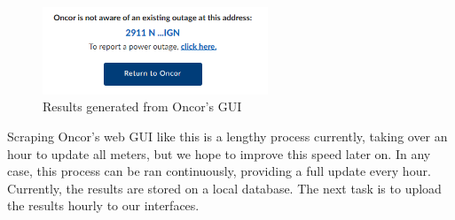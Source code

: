 \documentclass[]{article}
\begin{document}
\begin{figure}[h]
    \centering
    \includegraphics[width=0.6\textwidth]{oncor_status.PNG}
    \caption{Results generated from Oncor's GUI}
    \label{fig:oncor_out}    
\end{figure}
Scraping Oncor's web GUI like this is a lengthy process currently, taking over an hour to update all meters, but we hope to improve this speed later on. In any case, this process can be ran continuously, providing a full update every hour. Currently, the results are stored on a local database. The next task is to upload the results hourly to our interfaces.
\end{document}
